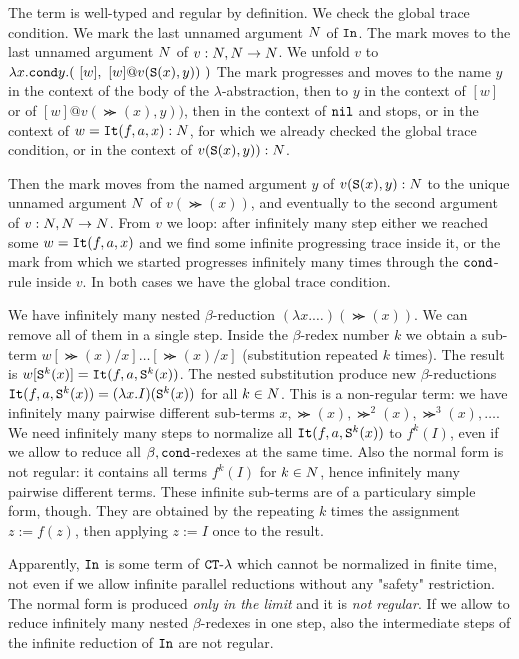 \documentclass{article}
\begin{document}
The term is well-typed and regular by definition. We check the global trace condition.
We mark the last unnamed argument ${N}$ of ${\tt In}$.
The mark moves to the last unnamed argument ${N}$ of  
$v:{N},{N} \rightarrow {N}$. 
We unfold $v$ to $\lambda x.{\tt cond} y. 
(\ [w],  \  [w] @ v({\tt S} (x),y)) \ )$
The mark progresses and moves to the name $y$ in the context of the body of the $\lambda$-abstraction,
then to $y$ in the context of $[w]$ or of $ [w] @ v(\Succ (x),y))$,
then in the context of ${\tt nil}$ and stops, or in the context of $w={\tt It}(f,a,x):{N}$, 
for which we already checked the global trace condition, or in the context of $v({\tt S} (x),y)):{N}$. 

Then the mark moves from the named argument $y$ of $v({\tt S} (x),y):{N}$ to the unique 
unnamed argument ${N}$ of $v(\Succ (x))$, 
and eventually to the second argument of $v:{N},{N}\rightarrow {N}$. 
From $v$ we loop: after infinitely many step either we reached some $w={\tt It}(f,a,x)$ 
and we find some infinite progressing trace inside it, or the
mark from which we started progresses infinitely many times through the ${\tt cond}$-rule inside $v$. 
In both cases we have the global trace condition.

We have infinitely many nested $\beta$-reduction $(\lambda x. \ldots)(\Succ (x))$.
We can remove all of them in a single step. Inside the $\beta$-redex number $k$ we obtain a sub-term
$w[\Succ (x)/x]\ldots[\Succ (x)/x]$ (substitution repeated $k$ times).
The result is $w[{\tt S} ^k(x)] = {\tt It}(f,a,{\tt S} ^k(x))$.
The nested substitution produce new $\beta$-reductions 
${\tt It}(f,a,{\tt S} ^k(x)) = (\lambda x.I)({\tt S} ^k(x))$ for all $k \in {N}$.
This is a non-regular term: we have infinitely many pairwise different 
sub-terms $x,\Succ (x),\Succ^2(x), \Succ^3(x), \ldots$.
We need infinitely many steps to normalize all ${\tt It}(f,a,{\tt S}^k(x))$ to $f^k(I)$, 
even if we allow to reduce all $\beta,{\tt cond}$-redexes at the same time.
Also the normal form is not regular: it contains all terms $f^k(I)$ for $k \in {N}$, hence
infinitely many pairwise different terms. These infinite sub-terms are of a particulary simple form, though. 
They are obtained by the repeating $k$ times the assignment $z:=f(z)$, then applying $z:=I$ once
to the result.

Apparently, ${\tt In}$  
is some term of ${ {\tt CT}\mbox{-}\lambda}$ which cannot be normalized in finite time, not even if we allow
infinite parallel reductions without any "safety" restriction. 
The normal form is produced \emph{only in the limit}
and it is \emph{not regular}. If we allow to reduce infinitely many nested $\beta$-redexes in one step, also
the intermediate steps of the infinite reduction of ${\tt In}$ are not regular.
\end{document}
